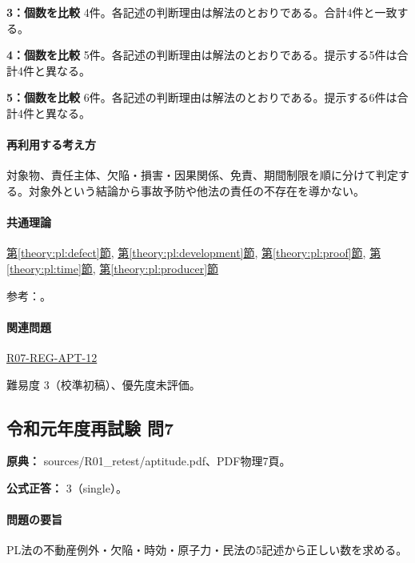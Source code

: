 \noindent\textbf{3：個数を比較} 4件。各記述の判断理由は解法のとおりである。合計4件と一致する。\par

\noindent\textbf{4：個数を比較} 5件。各記述の判断理由は解法のとおりである。提示する5件は合計4件と異なる。\par

\noindent\textbf{5：個数を比較} 6件。各記述の判断理由は解法のとおりである。提示する6件は合計4件と異なる。\par

\paragraph{再利用する考え方} 対象物、責任主体、欠陥・損害・因果関係、免責、期間制限を順に分けて判定する。対象外という結論から事故予防や他法の責任の不存在を導かない。

\paragraph{共通理論} \hyperref[theory:pl:defect]{第\ref*{theory:pl:defect}節}, \hyperref[theory:pl:development]{第\ref*{theory:pl:development}節}, \hyperref[theory:pl:proof]{第\ref*{theory:pl:proof}節}, \hyperref[theory:pl:time]{第\ref*{theory:pl:time}節}, \hyperref[theory:pl:producer]{第\ref*{theory:pl:producer}節}

\par 参考：\cite{pl_statute,pl_qa,pl_transition2020}。

\paragraph{関連問題} \hyperref[q:r07-reg-apt-12]{R07-REG-APT-12}

\par 難易度 3（校準初稿）、優先度未評価。

\subsection{令和元年度再試験 問7}
\label{q:r01-ret-apt-07}

\noindent\textbf{原典：} sources/R01\_retest/aptitude.pdf、PDF物理7頁。

\textbf{公式正答：} 3（single）。

\paragraph{問題の要旨} PL法の不動産例外・欠陥・時効・原子力・民法の5記述から正しい数を求める。

